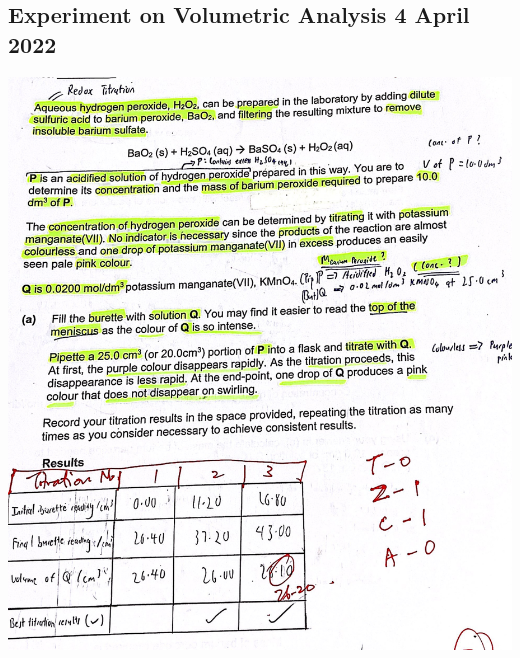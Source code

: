 \documentclass[oneside]{book}
\begin{document}
\subsection{Experiment on Volumetric Analysis 4 April 2022}
\begin{center}
    \includegraphics[width=\textwidth,height=\textheight,keepaspectratio]{images/308E24F7-4813-47C9-B60B-591E81D02F4B.jpeg}\\

\end{center}
\end{document}

